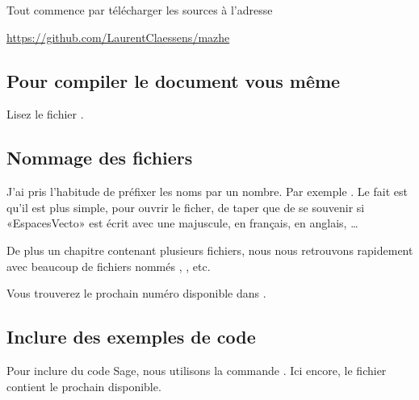 Tout commence par télécharger les sources à l'adresse
\begin{center}
    \url{https://github.com/LaurentClaessens/mazhe}
\end{center}

\subsection{Pour compiler le document vous même}

Lisez le fichier .

\subsection{Nommage des fichiers }

J'ai pris l'habitude de préfixer les noms par un nombre. Par exemple . Le fait est qu'il est plus simple, pour ouvrir le ficher, de taper  que de se souvenir si «EspacesVecto» est écrit avec une majuscule, en français, en anglais, \ldots

De plus un chapitre contenant plusieurs fichiers, nous nous retrouvons rapidement avec beaucoup de fichiers nommés , , etc.

Vous trouverez le prochain numéro disponible dans .

\subsection{Inclure des exemples de code}

Pour inclure du code Sage, nous utilisons la commande . Ici encore, le fichier  contient le prochain disponible.

